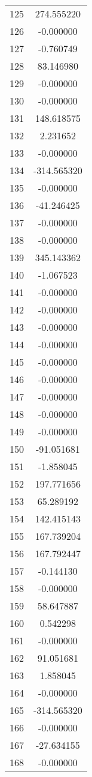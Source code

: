 \documentclass[12pt]{article}
\begin{document}
\begin{longtable}{@{}cc@{}}
125 & 274.555220 \\
126 & -0.000000 \\
127 & -0.760749 \\
128 & 83.146980 \\
129 & -0.000000 \\
130 & -0.000000 \\
131 & 148.618575 \\
132 & 2.231652 \\
133 & -0.000000 \\
134 & -314.565320 \\
135 & -0.000000 \\
136 & -41.246425 \\
137 & -0.000000 \\
138 & -0.000000 \\
139 & 345.143362 \\
140 & -1.067523 \\
141 & -0.000000 \\
142 & -0.000000 \\
143 & -0.000000 \\
144 & -0.000000 \\
145 & -0.000000 \\
146 & -0.000000 \\
147 & -0.000000 \\
148 & -0.000000 \\
149 & -0.000000 \\
150 & -91.051681 \\
151 & -1.858045 \\
152 & 197.771656 \\
153 & 65.289192 \\
154 & 142.415143 \\
155 & 167.739204 \\
156 & 167.792447 \\
157 & -0.144130 \\
158 & -0.000000 \\
159 & 58.647887 \\
160 & 0.542298 \\
161 & -0.000000 \\
162 & 91.051681 \\
163 & 1.858045 \\
164 & -0.000000 \\
165 & -314.565320 \\
166 & -0.000000 \\
167 & -27.634155 \\
168 & -0.000000 \\

\end{longtable}
\end{document}
